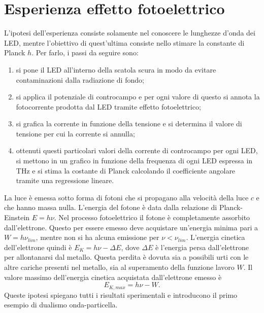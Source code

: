 \section{Esperienza effetto fotoelettrico}
L'ipotesi dell'esperienza consiste solamente nel conoscere le lunghezze d'onda dei LED, mentre l'obiettivo di quest'ultima consiste nello stimare la constante di Planck $h$. Per farlo, i passi da seguire sono:
\begin{enumerate}
    \item si pone il LED all'interno della scatola scura in modo da evitare contaminazioni dalla radiazione di fondo;
    \item si applica il potenziale di controcampo e per ogni valore di questo si annota la fotocorrente prodotta dal LED tramite effetto fotoelettrico;
    \item si grafica la corrente in funzione della tensione e si determina il valore di tensione per cui la corrente si annulla;
    \item ottenuti questi particolari valori della corrente di controcampo per ogni LED, si mettono in un grafico in funzione della frequenza di ogni LED espressa in THz e si stima la costante di Planck calcolando il coefficiente angolare tramite una regressione lineare. 
\end{enumerate}
\begin{obs}
    La luce è emessa sotto forma di fotoni che si propagano alla velocità della luce $c$ e che hanno massa nulla. L'energia del fotone è data dalla relazione di Planck-Einstein $E=h\nu$. Nel processo fotoelettrico il fotone è completamente assorbito dall'elettrone. Questo per essere emesso deve acquistare un'energia minima pari a $W=h\nu_{lim}$, mentre non si ha alcuna emissione per $\nu<\nu_{lim}$. L'energia cinetica dell'elettrone quindi è $E_K=h\nu-\Delta E$, dove $\Delta E$ è l'energia persa dall'elettrone per allontanarsi dal metallo. Questa perdita è dovuta sia a possibili urti con le altre cariche presenti nel metallo, sia al superamento della funzione lavoro $W$. Il valore massimo dell'energia cinetica acquistata dall'elettrone emesso è 
    \begin{equation}
        E_{K,max}=h\nu-W.
    \end{equation}
    Queste ipotesi spiegano tutti i risultati sperimentali e introducono il primo esempio di dualismo onda-particella.
\end{obs}